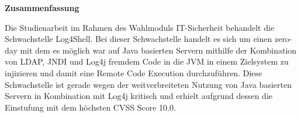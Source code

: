 
\textbf{\large Zusammenfassung}
\begin{justify}
Die Studienarbeit im Rahmen des Wahlmoduls IT-Sicherheit behandelt die Schwachstelle Log4Shell.
Bei dieser Schwachstelle handelt es sich um einen zero-day mit dem es möglich war auf Java basierten Servern mithilfe der Kombination von LDAP, JNDI und Log4j fremdem Code in die JVM in einem Zielsystem zu injizieren und damit eine Remote Code Execution durchzuführen.
Diese Schwachstelle ist gerade wegen der weitverbreiteten Nutzung von Java basierten Servern in Kombination mit Log4j kritisch und erhielt aufgrund dessen die Einstufung mit dem höchsten CVSS Score 10.0.
\end{justify}

